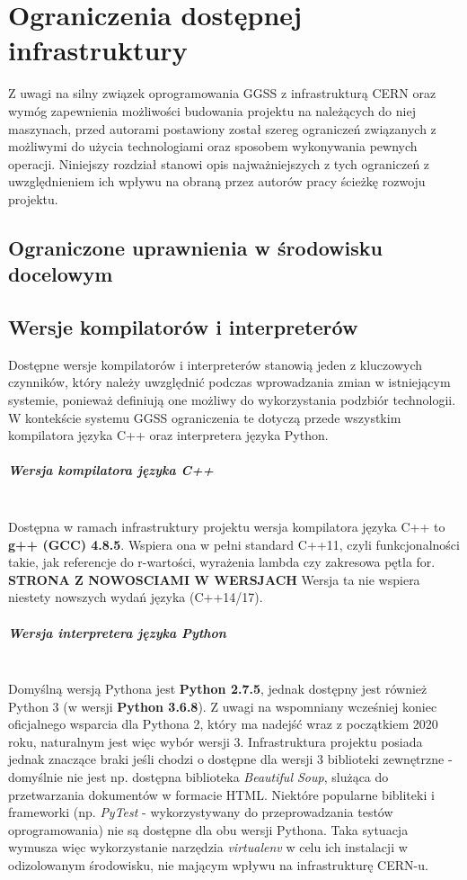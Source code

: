 \chapter{Ograniczenia dostępnej infrastruktury}
\label{cha:ogra}
Z uwagi na silny związek oprogramowania GGSS z infrastrukturą CERN oraz wymóg zapewnienia możliwości budowania projektu na należących do niej maszynach, przed autorami postawiony został szereg ograniczeń związanych z możliwymi do użycia technologiami oraz sposobem wykonywania pewnych operacji. Niniejszy rozdział stanowi opis najważniejszych z tych ograniczeń z uwzględnieniem ich wpływu na obraną przez autorów pracy ścieżkę rozwoju projektu.


\section{Ograniczone uprawnienia w środowisku docelowym}


\section{Wersje kompilatorów i interpreterów}
Dostępne wersje kompilatorów i interpreterów stanowią jeden z kluczowych czynników, który należy uwzględnić podczas wprowadzania zmian w istniejącym systemie, ponieważ definiują one możliwy do wykorzystania podzbiór technologii. W kontekście systemu GGSS ograniczenia te dotyczą przede wszystkim kompilatora języka C++ oraz interpretera języka Python. 

\paragraph*{Wersja kompilatora języka C++}\mbox{}\\
Dostępna w ramach infrastruktury projektu wersja kompilatora języka C++ to \textbf{g++ (GCC) 4.8.5}. Wspiera ona w pełni standard C++11, czyli funkcjonalności takie, jak referencje do r-wartości, wyrażenia lambda czy zakresowa pętla for. \textbf{STRONA Z NOWOSCIAMI W WERSJACH} Wersja ta nie wspiera niestety nowszych wydań języka (C++14/17).

\paragraph*{Wersja interpretera języka Python}\mbox{}\\
Domyślną wersją Pythona jest \textbf{Python 2.7.5}, jednak dostępny jest również Python 3 (w wersji \textbf{Python 3.6.8}). Z uwagi na wspomniany wcześniej koniec oficjalnego wsparcia dla Pythona 2, który ma nadejść wraz z początkiem 2020 roku, naturalnym jest więc wybór wersji 3. Infrastruktura projektu posiada jednak znaczące braki jeśli chodzi o dostępne dla wersji 3 biblioteki zewnętrzne - domyślnie nie jest np. dostępna biblioteka \textit{Beautiful Soup}, slużąca do przetwarzania dokumentów w formacie HTML. Niektóre popularne bibliteki i frameworki (np. \textit{PyTest} - wykorzystywany do przeprowadzania testów oprogramowania) nie są dostępne dla obu wersji Pythona. Taka sytuacja wymusza więc wykorzystanie narzędzia \textit{virtualenv} w celu ich instalacji w odizolowanym środowisku, nie mającym wpływu na infrastrukturę CERN-u.

